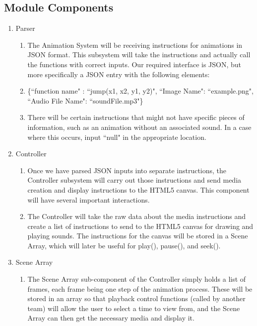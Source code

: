 \documentclass[12pt]{article}
\begin{document}
\subsection{Module Components}
\begin{enumerate}
\item Parser
\begin{enumerate}
\item The Animation System will be receiving instructions for animations in JSON format. This subsystem will take the instructions and actually call the functions with correct inputs. Our required interface is JSON, but more specifically a JSON entry with the following elements:
\item \{``function name" : ``jump(x1, x2, y1, y2)", ``Image Name": ``example.png", ``Audio File Name": ``soundFile.mp3"\}
\item There will be certain instructions that might not have specific pieces of information, such as an animation without an associated sound. In a case where this occurs, input ``null" in the appropriate location.

\end{enumerate}

\item Controller
\begin{enumerate}
\item Once we have parsed JSON inputs into separate instructions, the Controller subsystem will carry out those instructions and send media creation and display instructions to the HTML5 canvas. This component will have several important interactions.
\item The Controller will take the raw data about the media instructions and create a list of instructions to send to the HTML5 canvas for drawing and playing sounds. The instructions for the canvas will be stored in a Scene Array, which will later be useful for play(), pause(), and seek().
\end{enumerate}

\item Scene Array
\begin{enumerate}
\item The Scene Array sub-component of the Controller simply holds a list of frames, each frame being one step of the animation process. These will be stored in an array so that playback control functions (called by another team) will allow the user to select a time to view from, and the Scene Array can then get the necessary media and display it. 
\end{enumerate}



\end{enumerate}
\end{document}
